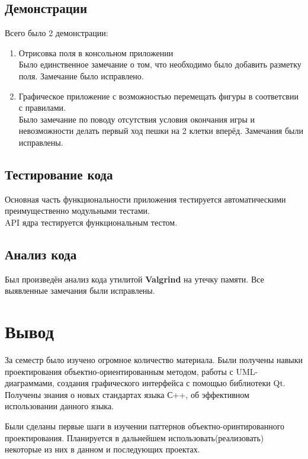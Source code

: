 \subsection*{Демонстрации}
Всего было 2 демонстрации:
\begin{enumerate}
\item Отрисовка поля в консольном приложении\\
Было единственное замечание о том, что необходимо было добавить разметку поля. Замечание было исправлено.\\
\item Графическое приложение с возможностью перемещать фигуры в соответсвии с правилами.\\
Было замечание по поводу отсутствия условия окончания игры и невозможности делать первый ход пешки на 2 клетки вперёд. Замечания были исправлены.\\
\end{enumerate}

\subsection*{Тестирование кода}
Основная часть функциональности приложения тестируется автоматическими преимущественно модульными тестами.\\
API ядра тестируется функциональным тестом.
\subsection*{Анализ кода}
Был произведён анализ кода утилитой \textbf{Valgrind} на утечку памяти. Все выявленные замечания были исправлены.

\section*{Вывод}
За семестр было изучено огромное количество материала. Были получены навыки проектирования объектно-ориентированным методом, работы с UML-диаграммами, создания графического интерфейса с помощью библиотеки Qt. Получены знания о новых стандартах языка С++, об эффективном использовании данного языка.

Были сделаны первые шаги в изучении паттернов объектно-оринтированного проектирования. Планируется в дальнейшем использовать(реализовать) некоторые из них в данном и последующих проектах.

